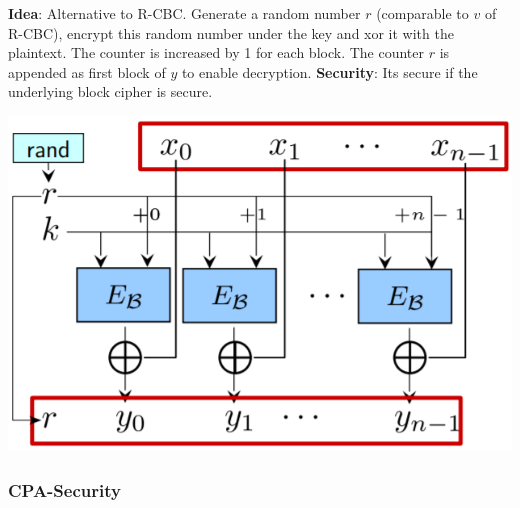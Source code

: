 \begin{minipage}{.55\linewidth}

\textbf{Idea}: Alternative to R-CBC. Generate a random number \(r\)
(comparable to \(v\) of R-CBC), encrypt this random number under the key
and xor it with the plaintext. The counter is increased by 1 for each
block. The counter \(r\) is appended as first block of \(y\) to enable
decryption. \newline\newline \textbf{Security}: Its secure if the
underlying block cipher is secure.

\end{minipage}\hfill
\begin{minipage}{.4\linewidth}
    \includegraphics[width=\linewidth]{img/rctr-mode}
\end{minipage}

\hypertarget{cpa-security}{%
\subsubsection{CPA-Security}\label{cpa-security}}

